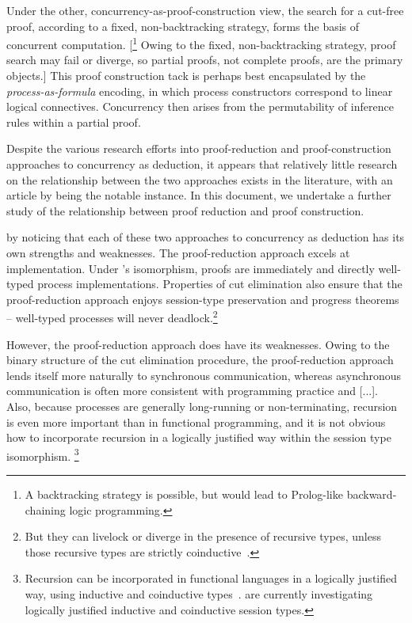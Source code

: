 Under the other, concurrency-as-proof-construction view, the search for a cut-free proof, according to a fixed, non-backtracking strategy, forms the basis of concurrent computation.%
[\footnote{A backtracking strategy is possible, but would lead to Prolog-like backward-chaining logic programming.}
Owing to the fixed, non-backtracking strategy, proof search may fail or diverge, so partial proofs, not complete proofs, are the primary objects.]
This proof construction tack is perhaps best encapsulated by the \emph{process-as-formula} encoding, in which process constructors correspond to linear logical connectives\autocite{Miller:??}.
Concurrency then arises from the permutability of inference rules within a partial proof.


Despite the various research efforts into proof-reduction and proof-construction approaches to concurrency as deduction, it appears that relatively little research on the relationship between the two approaches exists in the literature, with an article by \citeauthor{Cervesato+Scedrov:IC09} being the notable instance.\autocite{Cervesato+Scedrov:IC09}
In this document, we undertake a further study of the relationship between proof reduction and proof construction.

 by noticing that
%
each of these two approaches to concurrency as deduction has its own strengths and weaknesses.
The proof-reduction approach excels at
implementation.
Under \citeauthor{Caires+:MSCS16}'s isomorphism, proofs are immediately and directly well-typed process implementations.\autocites{Toninho+:ESOP13}{Griffith:UIUC16}
Properties of cut elimination also ensure that the proof-reduction approach enjoys session-type preservation and progress theorems -- well-typed processes will never deadlock.\footnote{But they can livelock or diverge in the presence of recursive types, unless those recursive types are strictly coinductive~\parencite{Derakhshan+Pfenning:LMCS20}.}

However, the proof-reduction approach does have its weaknesses.
Owing to the binary structure of the cut elimination procedure, the proof-reduction approach lends itself more naturally to synchronous communication, whereas asynchronous communication is often more consistent with programming practice and [...].
Also, because processes are generally long-running or non-terminating, recursion is even more important than in functional programming, and it is not obvious how to incorporate recursion in a logically justified way within the session type isomorphism.%
\footnote{Recursion can be incorporated in functional languages in a logically justified way, using inductive and coinductive types~\parencite{Mendler:LICS87}.
\Textcites{Derakhshan+Pfenning:LMCS20}{Somayyajula+Pfenning:20} are currently investigating logically justified inductive and coinductive session types.}

